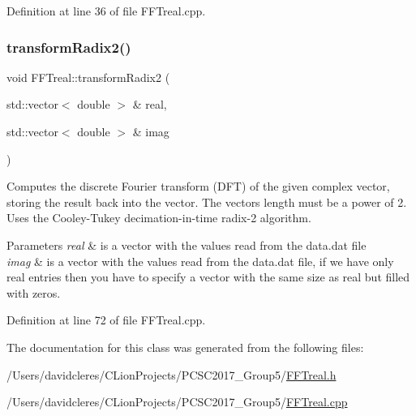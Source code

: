 Definition at line 36 of file F\+F\+Treal.\+cpp.

\mbox{\label{class_f_f_treal_afa3f0e3c25513ee26c9698b864330df9}} 
\subsubsection{\texorpdfstring{transform\+Radix2()}{transformRadix2()}}
{\footnotesize\ttfamily void F\+F\+Treal\+::transform\+Radix2 (\begin{DoxyParamCaption}\item[{std\+::vector$<$ double $>$ \&}]{real,  }\item[{std\+::vector$<$ double $>$ \&}]{imag }\end{DoxyParamCaption})}



Computes the discrete Fourier transform (D\+FT) of the given complex vector, storing the result back into the vector. The vector\textquotesingle{}s length must be a power of 2. Uses the Cooley-\/\+Tukey decimation-\/in-\/time radix-\/2 algorithm. 


\begin{DoxyParams}{Parameters}
{\em real} & is a vector with the values read from the data.\+dat file \\
\hline
{\em imag} & is a vector with the values read from the data.\+dat file, if we have only real entries then you have to specify a vector with the same size as real but filled with zeros. \\
\hline
\end{DoxyParams}


Definition at line 72 of file F\+F\+Treal.\+cpp.



The documentation for this class was generated from the following files\+:\begin{DoxyCompactItemize}
\item 
/\+Users/davidcleres/\+C\+Lion\+Projects/\+P\+C\+S\+C2017\+\_\+\+Group5/\mbox{\hyperlink{_f_f_treal_8h}{F\+F\+Treal.\+h}}\item 
/\+Users/davidcleres/\+C\+Lion\+Projects/\+P\+C\+S\+C2017\+\_\+\+Group5/\mbox{\hyperlink{_f_f_treal_8cpp}{F\+F\+Treal.\+cpp}}\end{DoxyCompactItemize}
